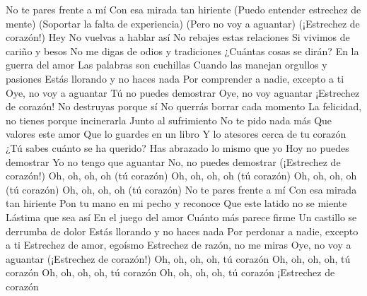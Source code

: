 No te pares frente a mí
Con esa mirada tan hiriente
(Puedo entender estrechez de mente)
(Soportar la falta de experiencia)
(Pero no voy a aguantar)
(¡Estrechez de corazón!)
Hey
No vuelvas a hablar así
No rebajes estas relaciones
Si vivimos de cariño y besos
No me digas de odios y tradiciones
¿Cuántas cosas se dirán?
En la guerra del amor
Las palabras son cuchillas
Cuando las manejan orgullos y pasiones
Estás llorando y no haces nada
Por comprender a nadie, excepto a ti
Oye, no voy a aguantar
Tú no puedes demostrar
Oye, no voy aguantar
¡Estrechez de corazón!
No destruyas porque sí
No querrás borrar cada momento
La felicidad, no tienes porque incinerarla
Junto al sufrimiento
No te pido nada más
Que valores este amor
Que lo guardes en un libro
Y lo atesores cerca de tu corazón
¿Tú sabes cuánto se ha querido?
Has abrazado lo mismo que yo
Hoy no puedes demostrar
Yo no tengo que aguantar
No, no puedes demostrar
(¡Estrechez de corazón!)
Oh, oh, oh, oh (tú corazón)
Oh, oh, oh, oh (tú corazón)
Oh, oh, oh, oh (tú corazón)
Oh, oh, oh, oh (tú corazón)
No te pares frente a mí
Con esa mirada tan hiriente
Pon tu mano en mi pecho y reconoce
Que este latido no se miente
Lástima que sea así
En el juego del amor
Cuánto más parece firme
Un castillo se derrumba de dolor
Estás llorando y no haces nada
Por perdonar a nadie, excepto a ti
Estrechez de amor, egoísmo
Estrechez de razón, no me miras
Oye, no voy a aguantar
(¡Estrechez de corazón!)
Oh, oh, oh, oh, tú corazón
Oh, oh, oh, oh, tú corazón
Oh, oh, oh, oh, tú corazón
Oh, oh, oh, oh, tú corazón
¡Estrechez de corazón